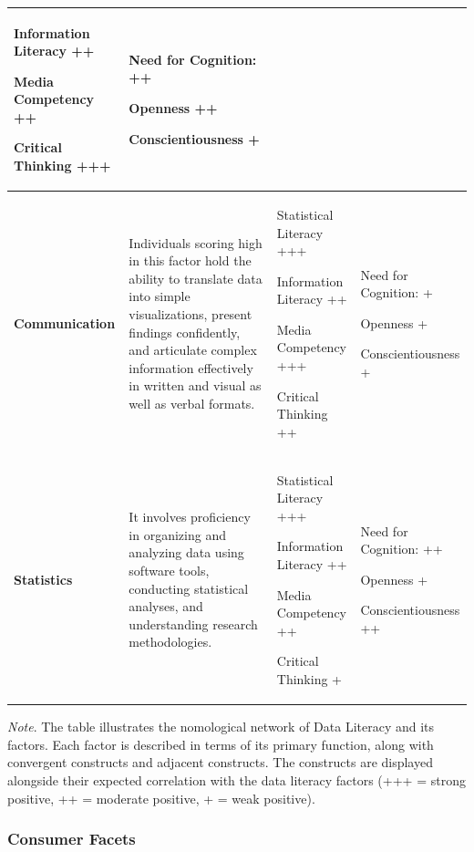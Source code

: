 \documentclass[
  12pt,
  a4paper,
  twoside]{article}
\begin{document}
\begin{table}[!htbp]
\begin{tabular}{|p{}|p{}|p{}|p{}|}
Information Literacy ++

Media Competency ++

Critical Thinking +++ 
& Need for Cognition: ++ 

Openness ++

Conscientiousness +\\
\hline
\textbf{Communication} & Individuals scoring high in this factor hold the ability to translate data into simple visualizations, present findings confidently, and articulate complex information effectively in written and visual as well as verbal formats. & Statistical Literacy +++

Information Literacy ++

Media Competency +++

Critical Thinking ++
& Need for Cognition: +

Openness +

Conscientiousness +\\
\hline
\textbf{Statistics} & It involves proficiency in organizing and analyzing data using software tools, conducting statistical analyses, and understanding research methodologies. & Statistical Literacy +++

Information Literacy ++

Media Competency ++

Critical Thinking +
& Need for Cognition: ++ 

Openness +

Conscientiousness ++\\
\hline
\end{tabular}
\begin{flushleft}
\vspace{9pt}
\footnotesize\textit{Note}. The table illustrates the nomological network of Data Literacy and its factors. Each factor is described in terms of its primary function, along with convergent constructs and adjacent constructs. The constructs are displayed alongside their expected correlation with the data literacy factors (+++ = strong positive, ++ = moderate positive, + = weak positive).    
\end{flushleft}

\end{table}

\subsubsection{Consumer Facets}\label{consumer-facets}
\end{document}
